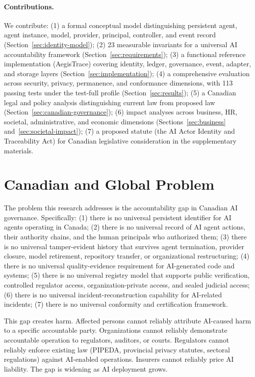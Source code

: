\documentclass[11pt,a4paper]{article}
\begin{document}
\paragraph{Contributions.} We contribute: (1) a formal conceptual model distinguishing persistent agent, agent instance, model, provider, principal, controller, and event record (Section~\ref{sec:identity-model}); (2) 23 measurable invariants for a universal AI accountability framework (Section~\ref{sec:requirements}); (3) a functional reference implementation (AegisTrace) covering identity, ledger, governance, event, adapter, and storage layers (Section~\ref{sec:implementation}); (4) a comprehensive evaluation across security, privacy, permanence, and conformance dimensions, with 113 passing tests under the test-full profile (Section~\ref{sec:results}); (5) a Canadian legal and policy analysis distinguishing current law from proposed law (Section~\ref{sec:canadian-governance}); (6) impact analyses across business, HR, societal, administrative, and economic dimensions (Sections~\ref{sec:business} and~\ref{sec:societal-impact}); (7) a proposed statute (the AI Actor Identity and Traceability Act) for Canadian legislative consideration in the supplementary materials.

\section{Canadian and Global Problem}
\label{sec:problem}

The problem this research addresses is the accountability gap in Canadian AI governance. Specifically: (1) there is no universal persistent identifier for AI agents operating in Canada; (2) there is no universal record of AI agent actions, their authority chains, and the human principals who authorized them; (3) there is no universal tamper-evident history that survives agent termination, provider closure, model retirement, repository transfer, or organizational restructuring; (4) there is no universal quality-evidence requirement for AI-generated code and systems; (5) there is no universal registry model that supports public verification, controlled regulator access, organization-private access, and sealed judicial access; (6) there is no universal incident-reconstruction capability for AI-related incidents; (7) there is no universal conformity and certification framework.

This gap creates harm. Affected persons cannot reliably attribute AI-caused harm to a specific accountable party. Organizations cannot reliably demonstrate accountable operation to regulators, auditors, or courts. Regulators cannot reliably enforce existing law (PIPEDA, provincial privacy statutes, sectoral regulations) against AI-enabled operations. Insurers cannot reliably price AI liability. The gap is widening as AI deployment grows.
\end{document}

